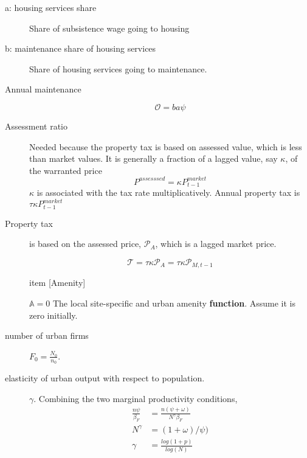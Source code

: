 \begin{description}
\item[a: housing services share] Share of subsistence wage going to housing 




\item[b: maintenance share of housing services ] Share of housing services going to maintenance.

\item [Annual maintenance]
\[\mathcal{O}=   ba\psi \]

\item[Assessment ratio] 
Needed because the property tax is based on assessed value, which is less than market values. It is generally a fraction of a lagged value, say $\kappa$,  of the warranted price
\[P^{assesssed}=  \kappa P_{t-1}^{market}\]
$\kappa$ is associated with the tax rate multiplicatively. Annual property tax is $\tau\kappa P_{t-1}^{market}$

\item [Property tax] is based on the assessed price, $\mathcal{P}_{A}$, which is a lagged market price.

\[\mathcal{T} = \tau\kappa  \mathcal{P}_{A} =  \tau\kappa \mathcal{P}_{M, t-1} \]



item [Amenity]

$\mathbb{A}=0$
The local site-specific and urban amenity \textbf{function}. %
 Assume it is zero initially.




\item[number of urban firms]  $F_0=\frac{N_0}{n_0}$. %

\item[elasticity of urban output with respect to population.] $\gamma$. Combining the two marginal productivity conditions, 
\begin{align}
\frac{n\psi}{\beta_F}  &= \frac{n(\psi+\omega)}{N^\gamma \beta_F}  \\
N^\gamma &= (1+\omega)/\psi)\\
\gamma &= \frac{log(1+p)}{log(N)}
\end{align}


\end{description}
